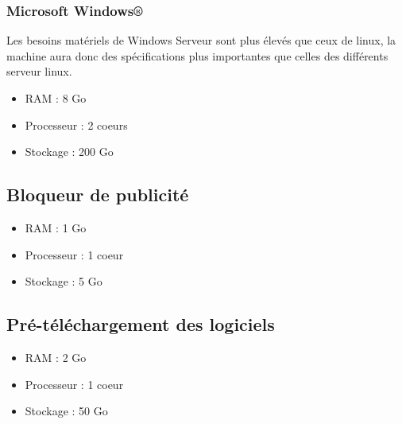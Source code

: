 \documentclass[14pt,a4paper]{extarticle}
\newcommand{\windaube}{Microsoft Windows®}
\begin{document}
\subsubsection{\windaube}
Les besoins matériels de Windows Serveur sont plus élevés que ceux de linux, la machine aura donc des spécifications plus importantes que celles des différents serveur linux.
\begin{itemize}
    \item{RAM : 8 Go}
    \item{Processeur : 2 coeurs}
    \item{Stockage : 200 Go}
\end{itemize}
\break
\subsection{Bloqueur de publicité}
\begin{itemize}
    \item{RAM : 1 Go}
    \item{Processeur : 1 coeur}
    \item{Stockage : 5 Go}
\end{itemize}
\subsection{Pré-téléchargement des logiciels}
\begin{itemize}
    \item{RAM : 2 Go}
    \item{Processeur : 1 coeur}
    \item{Stockage : 50 Go}
\end{itemize}
\end{document}
